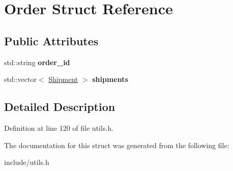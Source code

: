 \hypertarget{structOrder}{}\section{Order Struct Reference}
\label{structOrder}
\subsection*{Public Attributes}
\begin{DoxyCompactItemize}
\item 
\mbox{\label{structOrder_aa2961688ae8617be73ff5c9686f3cc36}} 
std\+::string {\bfseries order\+\_\+id}
\item 
\mbox{\label{structOrder_a325df31af4ce3ebaa72b06585e5f100a}} 
std\+::vector$<$ \hyperlink{structShipment}{Shipment} $>$ {\bfseries shipments}
\end{DoxyCompactItemize}


\subsection{Detailed Description}


Definition at line 120 of file utils.\+h.



The documentation for this struct was generated from the following file\+:\begin{DoxyCompactItemize}
\item 
include/utils.\+h\end{DoxyCompactItemize}
